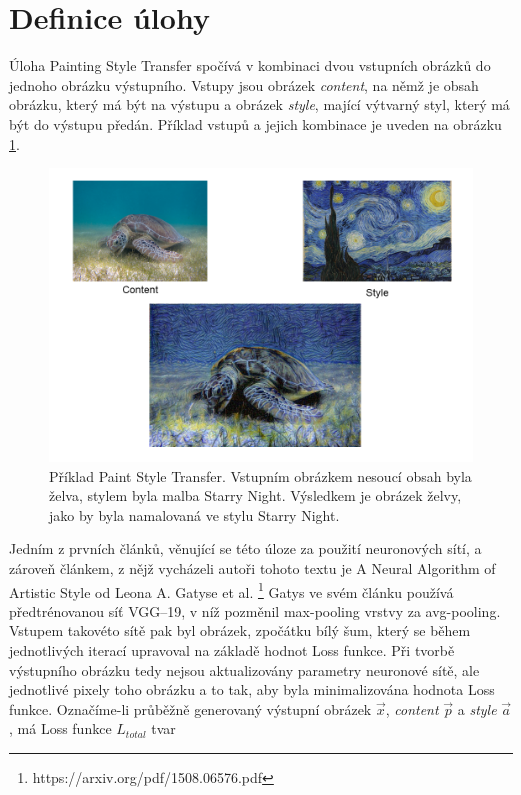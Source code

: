 \documentclass[twocolumn]{article}
\begin{document}
	\section*{Definice úlohy}
	Úloha Painting Style Transfer spočívá v kombinaci dvou vstupních obrázků do jednoho obrázku výstupního. Vstupy jsou obrázek \textit{content}, na němž je obsah obrázku, který má být na výstupu a obrázek \textit{style}, mající výtvarný styl, který má být do výstupu předán. Příklad vstupů a jejich kombinace je uveden na obrázku \ref{fig1}.
	\begin{figure}[ht]
	\includegraphics[width=\linewidth]{Ex_cropped.png}
	\caption{Příklad Paint Style Transfer. Vstupním obrázkem nesoucí obsah byla želva, stylem byla malba Starry Night. Výsledkem je obrázek želvy, jako by byla namalovaná ve stylu Starry Night.}
	\label{fig1}
	\end{figure}
	\par
	Jedním z prvních článků, věnující se této úloze za použití neuronových sítí, a zároveň článkem, z nějž vycházeli autoři tohoto textu je A Neural Algorithm of Artistic Style od Leona A. Gatyse et al. \footnote{https://arxiv.org/pdf/1508.06576.pdf} Gatys ve svém článku používá předtrénovanou síť VGG--19, v níž pozměnil max-pooling vrstvy za avg-pooling. Vstupem takovéto sítě pak byl obrázek, zpočátku bílý šum, který se během jednotlivých iterací upravoval na základě hodnot Loss funkce. Při tvorbě výstupního obrázku tedy nejsou aktualizovány parametry neuronové sítě, ale jednotlivé pixely toho obrázku a to tak, aby byla minimalizována hodnota Loss funkce. Označíme-li průběžně generovaný výstupní obrázek $\overrightarrow{x}$, \textit{content}  $\overrightarrow{p}$ a \textit{style}  $\overrightarrow{a}$, má Loss funkce $L_{total}$ tvar
\end{document}

